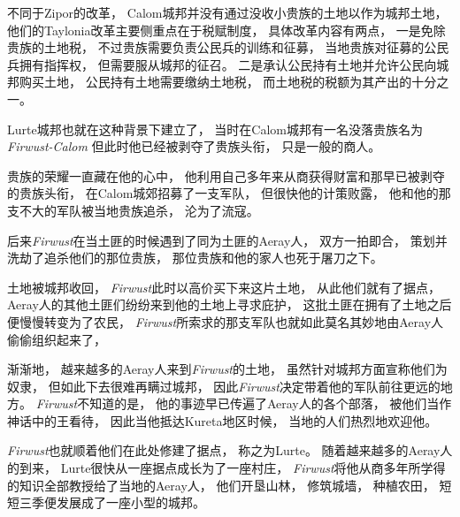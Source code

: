 \documentclass[UTF8,12pt,draft]{ctexbook}
\begin{document}
                不同于Zipor的改革，
                Calom城邦并没有通过没收小贵族的土地以作为城邦土地，
                他们的Taylonia改革主要侧重点在于税赋制度，
                具体改革内容有两点，
                一是免除贵族的土地税，
                不过贵族需要负责公民兵的训练和征募，
                当地贵族对征募的公民兵拥有指挥权，
                但需要服从城邦的征召。
                二是承认公民持有土地并允许公民向城邦购买土地，
                公民持有土地需要缴纳土地税，
                而土地税的税额为其产出的十分之一。

                Lurte城邦也就在这种背景下建立了，
                当时在Calom城邦有一名没落贵族名为\emph{Firwust-Calom}
                但此时他已经被剥夺了贵族头衔，
                只是一般的商人。

                贵族的荣耀一直藏在他的心中，
                他利用自己多年来从商获得财富和那早已被剥夺的贵族头衔，
                在Calom城郊招募了一支军队，
                但很快他的计策败露，
                他和他的那支不大的军队被当地贵族追杀，
                沦为了流寇。

                后来\emph{Firwust}在当土匪的时候遇到了同为土匪的Aeray人，
                双方一拍即合，
                策划并洗劫了追杀他们的那位贵族，
                那位贵族和他的家人也死于屠刀之下。

                土地被城邦收回，
                \emph{Firwust}此时以高价买下来这片土地，
                从此他们就有了据点，
                Aeray人的其他土匪们纷纷来到他的土地上寻求庇护，
                这批土匪在拥有了土地之后便慢慢转变为了农民，
                \emph{Firwust}所索求的那支军队也就如此莫名其妙地由Aeray人偷偷组织起来了，

                渐渐地，
                越来越多的Aeray人来到\emph{Firwust}的土地，
                虽然针对城邦方面宣称他们为奴隶，
                但如此下去很难再瞒过城邦，
                因此\emph{Firwust}决定带着他的军队前往更远的地方。
                \emph{Firwust}不知道的是，
                他的事迹早已传遍了Aeray人的各个部落，
                被他们当作神话中的王看待，
                因此当他抵达Kureta地区时候，
                当地的人们热烈地欢迎他。

                \emph{Firwust}也就顺着他们在此处修建了据点，
                称之为Lurte。
                随着越来越多的Aeray人的到来，
                Lurte很快从一座据点成长为了一座村庄，
                \emph{Firwust}将他从商多年所学得的知识全部教授给了当地的Aeray人，
                他们开垦山林，
                修筑城墙，
                种植农田，
                短短三季便发展成了一座小型的城邦。
\end{document}
